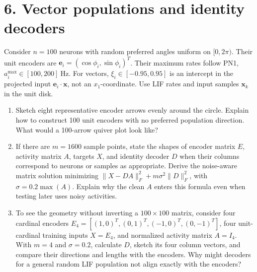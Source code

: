 \documentclass[11pt,letterpaper]{article}
\newcommand{\vct}[1]{\boldsymbol{#1}}
\begin{document}
\section*{6. Vector populations and identity decoders}
Consider \(n=100\) neurons with random preferred angles uniform on \([0,2\pi)\). Their unit encoders are \(\vct{e}_i=(\cos\phi_i,\sin\phi_i)^T\). Their maximum rates follow PN1, \(a_i^{\max}\in[100,200]~\mathrm{Hz}\). For vectors, \(\xi_i\in[-0.95,0.95]\) is an intercept in the projected input \(\vct{e}_i\cdot\vct{x}\), not an \(x_1\)-coordinate. Use LIF rates and input samples \(\vct{x}_k\) in the unit disk.
\begin{enumerate}[label=\textbf{6\alph*.}]
\item Sketch eight representative encoder arrows evenly around the circle. Explain how to construct 100 unit encoders with no preferred population direction. What would a 100-arrow quiver plot look like?
\item If there are \(m=1600\) sample points, state the shapes of encoder matrix \(E\), activity matrix \(A\), targets \(X\), and identity decoder \(D\) when their columns correspond to neurons or samples as appropriate. Derive the noise-aware matrix solution minimizing \(\|X-DA\|_F^2+m\sigma^2\|D\|_F^2\), with \(\sigma=0.2\max(A)\). Explain why the clean \(A\) enters this formula even when testing later uses noisy activities.
\item To see the geometry without inverting a \(100\times100\) matrix, consider four cardinal encoders \(E_4=[(1,0)^T,(0,1)^T,(-1,0)^T,(0,-1)^T]\), four unit-cardinal training inputs \(X=E_4\), and normalized activity matrix \(A=I_4\). With \(m=4\) and \(\sigma=0.2\), calculate \(D\), sketch its four column vectors, and compare their directions and lengths with the encoders. Why might decoders for a general random LIF population not align exactly with the encoders?
\end{enumerate}

\newpage
\end{document}

